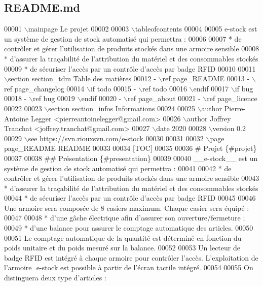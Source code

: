 \hypertarget{_r_e_a_d_m_e_8md_source}{}\subsection{R\+E\+A\+D\+M\+E.\+md}

\begin{DoxyCode}
00001 \(\backslash\)mainpage Le projet 
00002 
00003 \(\backslash\)tableofcontents
00004 
00005 e-stock est un système de gestion de stock automatisé qui permettra :
00006 
00007 * de contrôler et gérer l'utilisation de produits stockés dans une armoire sensible
00008 * d'assurer la traçabilité de l'attribution du matériel et des consommables stockés
00009 * de sécuriser l'accès par un contrôle d'accès par badge RFID
00010 
00011 \(\backslash\)section section\_tdm Table des matières
00012 - \(\backslash\)ref page\_README
00013 - \(\backslash\)ref page\_changelog
00014 \(\backslash\)if todo
00015 - \(\backslash\)ref todo
00016 \(\backslash\)endif
00017 \(\backslash\)if bug
00018 - \(\backslash\)ref bug
00019 \(\backslash\)endif
00020 - \(\backslash\)ref page\_about
00021 - \(\backslash\)ref page\_licence
00022 
00023 \(\backslash\)section section\_infos Informations
00024 
00025 \(\backslash\)author Pierre-Antoine Legger <pierreantoinelegger@gmail.com>
00026 \(\backslash\)author Joffrey Tranchat <joffrey.tranchat@gmail.com>
00027 \(\backslash\)date 2020
00028 \(\backslash\)version 0.2
00029 \(\backslash\)see https://svn.riouxsvn.com/e-stock
00030 
00031 
00032 \(\backslash\)page page\_README README
00033 
00034 [TOC]
00035 
00036 # Projet \{#projet\}
00037 
00038 ## Présentation \{#presentation\}
00039 
00040 \_\_e-stock\_\_ est un système de gestion de stock automatisé qui permettra :
00041 
00042 * de contrôler et gérer l'utilisation de produits stockés dans une armoire sensible
00043 * d'assurer la traçabilité de l'attribution du matériel et des consommables stockés
00044 * de sécuriser l'accès par un contrôle d'accès par badge RFID
00045 
00046 Une armoire sera composée de 8 casiers maximum. Chaque casier sera équipé :
00047 
00048 * d'une gâche électrique afin d'assurer son ouverture/fermeture ;
00049 * d'une balance pour assurer le comptage automatique des articles.
00050 
00051 Le comptage automatique de la quantité est déterminé en fonction du poids unitaire et du poids mesuré
       sur la balance.
00052 
00053 Un lecteur de badge RFID est intégré à chaque armoire pour contrôler l'accès. L'exploitation de
       l'armoire ​ e-stock​ est possible à partir de l'écran tactile intégré.
00054 
00055 On distinguera deux type d'articles :

\end{DoxyCode}
